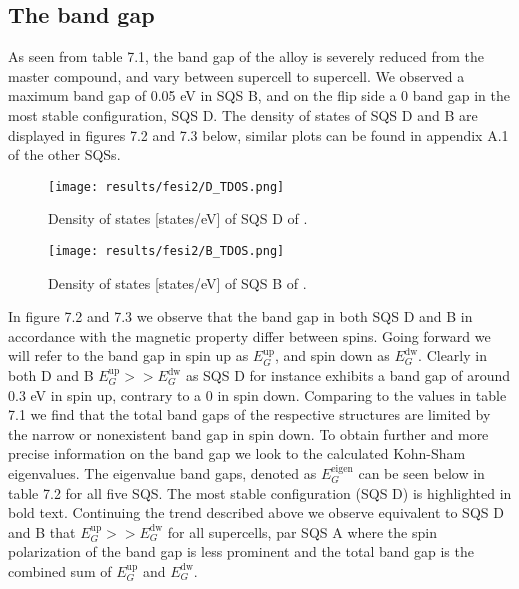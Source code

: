\newpage
\subsection{The band gap}
As seen from table 7.1, the band gap of the alloy is severely reduced from the master compound, and vary between supercell to supercell. We observed a maximum band gap of 0.05 eV in SQS B, and on the flip side a 0 band gap in the most stable configuration, SQS D. The density of states of SQS D and B are displayed in figures 7.2 and 7.3 below, similar plots can be found in appendix A.1 of the other SQSs. 

\begin{figure}[H]
	\centering
	\texttt{[image: results/fesi2/D\_TDOS.png]}
	\caption{Density of states [states/eV] of SQS D of .}
\end{figure}

\begin{figure}[H]
\centering
	\texttt{[image: results/fesi2/B\_TDOS.png]}
	\caption{Density of states [states/eV] of SQS B of .}
\end{figure}  

In figure 7.2  and 7.3 we observe that the band gap in both SQS D and B in accordance with the magnetic property differ between spins. Going forward we will refer to the band gap in spin up as $E_G ^\text{up}$, and spin down as $E_G ^\text{dw}$. Clearly in both D and B $E_G ^\text{up} >> E_G ^\text{dw}$ as SQS D for instance exhibits a band gap of around 0.3 eV in spin up, contrary to a 0 in spin down. Comparing to the values in table 7.1 we find that the total band gaps of the respective structures are limited by the narrow or nonexistent band gap in spin down. To obtain further and more precise information on the band gap we look to the calculated Kohn-Sham eigenvalues. The eigenvalue band gaps, denoted as $E_G ^\text{eigen}$ can be seen below in table 7.2 for all five SQS. The most stable configuration (SQS D) is highlighted in bold text. Continuing the trend described above we observe equivalent to SQS D and B that $E_G ^\text{up} >> E_G ^\text{dw}$ for all supercells, par SQS A where the spin polarization of the band gap is less prominent and the total band gap is the combined sum of $E_G ^\text{up}$ and $E_G ^\text{dw}$.


